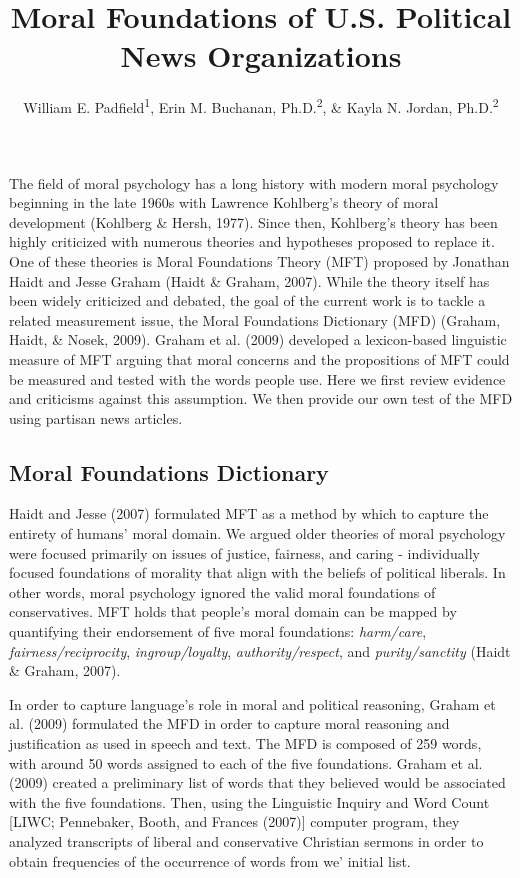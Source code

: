 \documentclass[
  english,
  man,floatsintext]{apa6}
\title{Moral Foundations of U.S. Political News Organizations}
\author{William E. Padfield\textsuperscript{1}, Erin M. Buchanan, Ph.D.\textsuperscript{2}, \& Kayla N. Jordan, Ph.D.\textsuperscript{2}}
\date{}
\affiliation{\vspace{0.5cm}\textsuperscript{1} Missouri State University\\\textsuperscript{2} Harrisburg University of Science and Technology}
\begin{document}
\maketitle

The field of moral psychology has a long history with modern moral psychology beginning in the late 1960s with Lawrence Kohlberg's theory of moral development (Kohlberg \& Hersh, 1977). Since then, Kohlberg's theory has been highly criticized with numerous theories and hypotheses proposed to replace it. One of these theories is Moral Foundations Theory (MFT) proposed by Jonathan Haidt and Jesse Graham (Haidt \& Graham, 2007). While the theory itself has been widely criticized and debated, the goal of the current work is to tackle a related measurement issue, the Moral Foundations Dictionary (MFD) (Graham, Haidt, \& Nosek, 2009). Graham et al. (2009) developed a lexicon-based linguistic measure of MFT arguing that moral concerns and the propositions of MFT could be measured and tested with the words people use. Here we first review evidence and criticisms against this assumption. We then provide our own test of the MFD using partisan news articles.

\hypertarget{moral-foundations-dictionary}{%
\subsection{Moral Foundations Dictionary}\label{moral-foundations-dictionary}}

Haidt and Jesse (2007) formulated MFT as a method by which to capture the entirety of humans' moral domain. We argued older theories of moral psychology were focused primarily on issues of justice, fairness, and caring - individually focused foundations of morality that align with the beliefs of political liberals. In other words, moral psychology ignored the valid moral foundations of conservatives. MFT holds that people's moral domain can be mapped by quantifying their endorsement of five moral foundations: \emph{harm/care}, \emph{fairness/reciprocity}, \emph{ingroup/loyalty}, \emph{authority/respect}, and \emph{purity/sanctity} (Haidt \& Graham, 2007).

In order to capture language's role in moral and political reasoning, Graham et al. (2009) formulated the MFD in order to capture moral reasoning and justification as used in speech and text. The MFD is composed of 259 words, with around 50 words assigned to each of the five foundations. Graham et al. (2009) created a preliminary list of words that they believed would be associated with the five foundations. Then, using the Linguistic Inquiry and Word Count {[}LIWC; Pennebaker, Booth, and Frances (2007){]} computer program, they analyzed transcripts of liberal and conservative Christian sermons in order to obtain frequencies of the occurrence of words from we' initial list.
\end{document}
